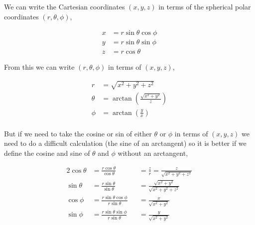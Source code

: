 \documentclass[11pt]{amsart}
\begin{document}
We can write the Cartesian coordinates $(x, y, z)$ in terms of the spherical polar coordinates $(r, \theta, \phi)$,

\begin{align*}
  x &= r\sin\theta\cos\phi \\
  y &= r\sin\theta\sin\phi \\
  z &= r\cos\theta
\end{align*}

From this we can write $(r, \theta, \phi)$ in terms of $(x, y, z)$,

\begin{align*}
  r&=\sqrt{x^2+y^2+z^2} \\
  \theta&=\arctan{\left(\frac{\sqrt{x^2 + y^2}}{z}\right)} \\
  \phi&=\arctan{\left(\frac{y}{x}\right)} \\
\end{align*}

But if we need to take the cosine or sin of either $\theta$ or $\phi$ in terms of $(x, y, z)$ we need to do a difficult calculation (the sine of an arctangent) so it is better if we define the cosine and sine of $\theta$ and $\phi$ without an arctangent,

\begin{alignat*}{2}
  \cos\theta&=\frac{r\cos\theta}{\cos\theta}&&=\frac{z}{r}=\frac{z}{\sqrt{x^2 + y^2 + z^2}}\\
  \sin\theta&=\frac{r\sin\theta}{\sin\theta}&&=\frac{\sqrt{x^2+y^2}}{\sqrt{x^2+y^2+z^2}}\\
  \cos\phi&=\frac{r\sin\theta\cos\phi}{r\sin\theta}&&=\frac{x}{\sqrt{x^2+y^2}}\\
  \sin\phi&=\frac{r\sin\theta\sin\phi}{r\sin\theta}&&=\frac{y}{\sqrt{x^2+y^2}}
\end{alignat*}
\end{document}
